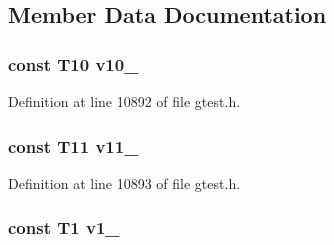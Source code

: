 \subsection{\-Member \-Data \-Documentation}
\hypertarget{classtesting_1_1internal_1_1ValueArray11_a147ca4457ea439b00a93087231ff77ef}{
\subsubsection[{v10\-\_\-}]{\setlength{\rightskip}{0pt plus 5cm}const \-T10 {\bf v10\-\_\-}}}\label{df/d49/classtesting_1_1internal_1_1ValueArray11_a147ca4457ea439b00a93087231ff77ef}


\-Definition at line 10892 of file gtest.\-h.

\hypertarget{classtesting_1_1internal_1_1ValueArray11_a12a4baf9ab57c7e9b5b4f1612e59e529}{
\subsubsection[{v11\-\_\-}]{\setlength{\rightskip}{0pt plus 5cm}const \-T11 {\bf v11\-\_\-}}}\label{df/d49/classtesting_1_1internal_1_1ValueArray11_a12a4baf9ab57c7e9b5b4f1612e59e529}


\-Definition at line 10893 of file gtest.\-h.

\hypertarget{classtesting_1_1internal_1_1ValueArray11_aac1d0654cc6c1aceb4a5d0fa7a98042e}{
\subsubsection[{v1\-\_\-}]{\setlength{\rightskip}{0pt plus 5cm}const \-T1 {\bf v1\-\_\-}}}\label{df/d49/classtesting_1_1internal_1_1ValueArray11_aac1d0654cc6c1aceb4a5d0fa7a98042e}


